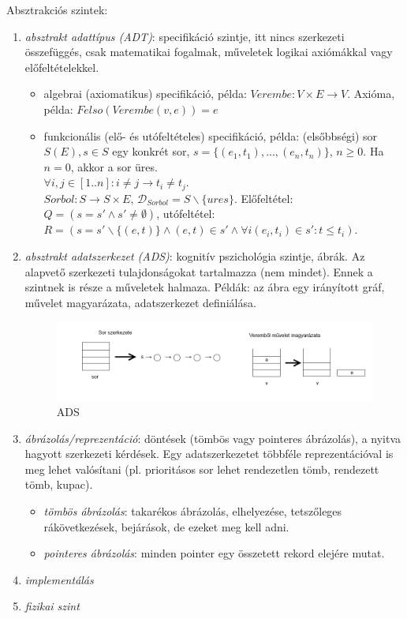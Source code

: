 \documentclass[margin=0px]{article}
\begin{document}
Absztrakciós szintek:
\begin{enumerate}
    \item \textit{absztrakt adattípus (ADT)}: specifikáció szintje, itt nincs szerkezeti összefüggés, csak matematikai fogalmak, műveletek logikai axiómákkal vagy előfeltételekkel.
          \begin{itemize}
              \item algebrai (axiomatikus) specifikáció, példa: $Verembe : V \times E \to V$. Axióma, példa: $Felso(Verembe(v,e)) = e$
              \item funkcionális (elő- és utófeltételes) specifikáció, példa: (elsőbbségi) sor $S(E), s \in S$ egy konkrét sor, $s = \{(e_1, t_1), ..., (e_n, t_n)\}$, $n \geq 0$. Ha $n=0$, akkor a sor üres. \\
                    $\forall i,j \in [1..n]: i \neq j \to t_i \neq t_j$. \\
                    $Sorbol: S \to S \times E$, $\mathcal{D}_{Sorbol} = S \backslash \{ures\}$. Előfeltétel: $Q = (s = s' \wedge s' \neq \emptyset)$, utófeltétel: $R = (s = s' \backslash \{(e,t)\} \wedge (e,t) \in s' \wedge \forall i (e_i, t_i) \in s' : t \leq t_i)$.
          \end{itemize}
    \item \textit{absztrakt adatszerkezet (ADS)}: kognitív pszichológia szintje, ábrák. Az alapvető szerkezeti tulajdonságokat tartalmazza (nem mindet). Ennek a szintnek is része a műveletek halmaza. Példák: az ábra egy irányított gráf, művelet magyarázata, adatszerkezet definiálása.
          \begin{figure}[H]
              \centering
              \includegraphics[width=1\textwidth]{img/ads.png}
              \caption{ADS}
          \end{figure}
    \item \textit{ábrázolás/reprezentáció}: döntések (tömbös vagy pointeres ábrázolás), a nyitva hagyott szerkezeti kérdések. Egy adatszerkezetet többféle reprezentációval is meg lehet valósítani (pl. prioritásos sor lehet rendezetlen tömb, rendezett tömb, kupac).
          \begin{itemize}
              \item \textit{tömbös ábrázolás}: takarékos ábrázolás, elhelyezése, tetszőleges rákövetkezések, bejárások, de ezeket meg kell adni.
              \item \textit{pointeres ábrázolás}: minden pointer egy összetett rekord elejére mutat.
          \end{itemize}
    \item \textit{implementálás}
    \item \textit{fizikai szint}
\end{enumerate}
\end{document}
